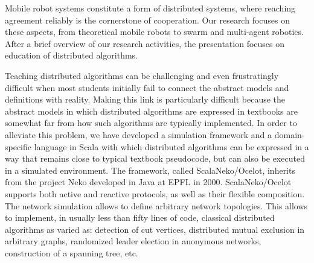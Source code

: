 Mobile robot systems constitute a form of distributed systems, where reaching agreement reliably is the cornerstone of cooperation. Our research focuses on these aspects, from theoretical mobile robots to swarm and multi-agent robotics. After a brief overview of our research activities, the presentation focuses on education of distributed algorithms.

Teaching distributed algorithms can be challenging and even frustratingly difficult when most students initially fail to connect the abstract models and definitions with reality. Making this link is particularly difficult because the abstract models in which distributed algorithms are expressed in textbooks are somewhat far from how such algorithms are typically implemented. In order to alleviate this problem, we have developed a simulation framework and a domain-specific language in Scala with which distributed algorithms can be expressed in a way that remains close to typical textbook pseudocode, but can also be executed in a simulated environment.
The framework, called ScalaNeko/Ocelot, inherits from the project Neko developed in Java at EPFL in 2000. ScalaNeko/Ocelot supports both active and reactive protocols, as well as their flexible composition. The network simulation allows to define arbitrary network topologies. This allows to implement, in usually less than fifty lines of code, classical distributed algorithms as varied as: detection of cut vertices, distributed mutual exclusion in arbitrary graphs, randomized leader election in anonymous networks, construction of a spanning tree, etc.

